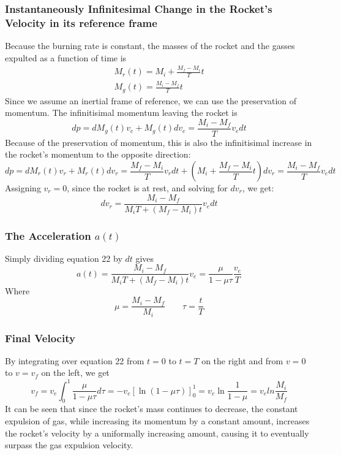 \documentclass{article}
\begin{document}
\subsubsection{Instantaneously Infinitesimal Change in the Rocket’s Velocity in its reference frame}
Because the burning rate is constant, the masses of the rocket and the gasses expulted as a function of time is
\begin{equation}
\begin{gathered}
    M_r(t) = M_i + \frac{M_f - M_i}{T}t \\
    M_g(t) = \frac{M_i - M_f}{T}t
\end{gathered}
\end{equation}
Since we assume an inertial frame of reference, we can use the preservation of momentum. The infinitisimal momentum leaving the rocket is
\begin{equation}
    dp = dM_g(t) v_e + M_g(t) dv_e = \frac{M_i - M_f}{T} v_e dt
\end{equation}
Because of the preservation of momentum, this is also the infinitisimal increase in the rocket's momentum to the opposite direction:
\begin{equation}
    dp = dM_r(t) v_r + M_r(t) dv_r = \frac{M_f - M_i}{T} v_r dt + \left(M_i + \frac{M_f - M_i}{T}t\right) dv_r = \frac{M_i - M_f}{T} v_e dt
\end{equation}
Assigning $v_r = 0$, since the rocket is at rest, and solving for $dv_r$, we get:
\begin{equation}
    dv_r = \frac{M_i - M_f}{M_i T + (M_f - M_i)t} v_e dt
\end{equation}
\subsubsection{The Acceleration $a(t)$}
Simply dividing equation 22 by $dt$ gives
\begin{equation}
    a(t) = \frac{M_i - M_f}{M_i T + (M_f - M_i)t} v_e = \frac{\mu}{1 - \mu\tau} \frac{v_e}{T}
\end{equation}
Where
\begin{equation}
    \mu = \frac{M_i - M_f}{M_i} \qquad \tau = \frac{t}{T}
\end{equation}
\subsubsection{Final Velocity}
By integrating over equation 22 from $t = 0$ to $t = T$ on the right and from $v = 0$ to $v = v_f$ on the left, we get
\begin{equation}
    v_f = v_e \int_{0}^{1} \frac{\mu}{1 - \mu\tau} d\tau = - v_e \left[\ln(1 - \mu\tau) \right]_0^1 = v_e \ln\frac{1}{1-\mu} = v_e ln\frac{M_i}{M_f}
\end{equation}
It can be seen that since the rocket's mass continues to decrease, the constant expulsion of gas, while increasing its momentum by a constant amount, increases the rocket's velocity by a uniformally increasing amount, causing it to eventually surpass the gas expulsion velocity.
\end{document}
